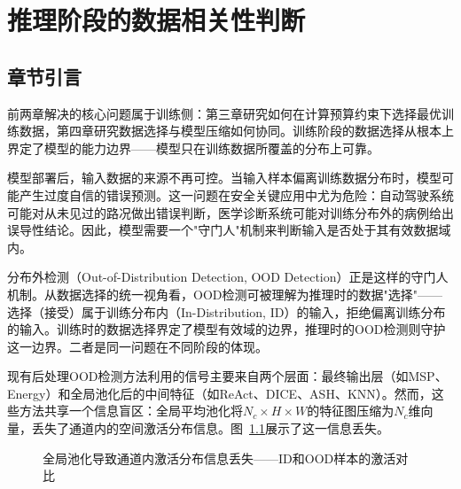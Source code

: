 \chapter{推理阶段的数据相关性判断}

\section{章节引言}

前两章解决的核心问题属于训练侧：第三章研究如何在计算预算约束下选择最优训练数据，第四章研究数据选择与模型压缩如何协同。训练阶段的数据选择从根本上界定了模型的能力边界——模型只在训练数据所覆盖的分布上可靠。

模型部署后，输入数据的来源不再可控。当输入样本偏离训练数据分布时，模型可能产生过度自信的错误预测\cite{hendrycks2016msp}。这一问题在安全关键应用中尤为危险：自动驾驶系统\cite{filos2020can, janai2020computer}可能对从未见过的路况做出错误判断，医学诊断系统\cite{pooch2020can}可能对训练分布外的病例给出误导性结论。因此，模型需要一个"守门人"机制来判断输入是否处于其有效数据域内。

分布外检测（Out-of-Distribution Detection, OOD Detection）正是这样的守门人机制\cite{yang2021generalized_survey}。从数据选择的统一视角看，OOD检测可被理解为推理时的数据"选择"——选择（接受）属于训练分布内（In-Distribution, ID）的输入，拒绝偏离训练分布的输入。训练时的数据选择界定了模型有效域的边界，推理时的OOD检测则守护这一边界。二者是同一问题在不同阶段的体现。

现有后处理OOD检测方法利用的信号主要来自两个层面：最终输出层（如MSP\cite{hendrycks2016msp}、Energy\cite{liu2020energy}）和全局池化后的中间特征（如ReAct\cite{sun2021react}、DICE\cite{sun2022dice}、ASH\cite{djurisic2022extremely}、KNN\cite{sun2022knn}）。然而，这些方法共享一个信息盲区：全局平均池化将$N_c \times H \times W$的特征图压缩为$N_c$维向量，丢失了通道内的空间激活分布信息。图~\ref{fig:nap-pooling-loss}展示了这一信息丢失。

\begin{figure}[htb]
  \centering
  \caption{全局池化导致通道内激活分布信息丢失——ID和OOD样本的激活对比}
  \label{fig:nap-pooling-loss}
\end{figure}

